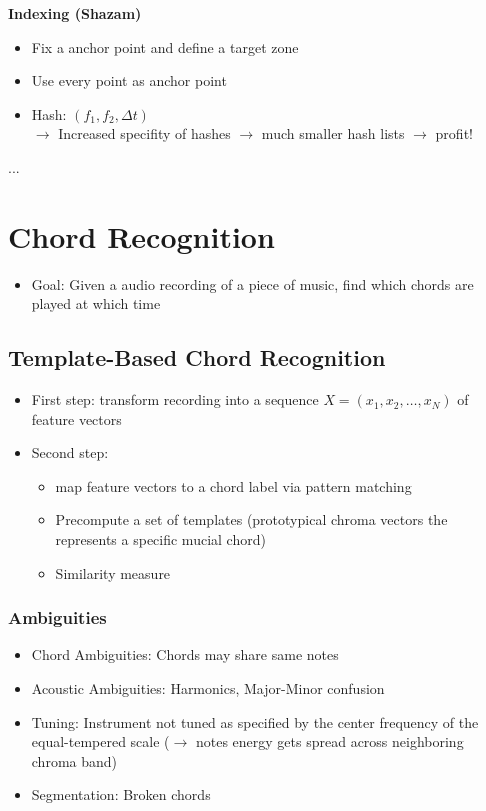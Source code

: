 \documentclass{scrartcl}
\begin{document}
\textbf{Indexing (Shazam)}
\begin{itemize}
    \item
        Fix a anchor point and define a target zone
    \item
        Use every point as anchor point
    \item
        Hash: $(f_1, f_2, \Delta t)$\\
        $\rightarrow$ Increased specifity of hashes $\rightarrow$ much smaller hash lists $\rightarrow$ profit!
\end{itemize}
...

\newpage

\section{Chord Recognition}
\begin{itemize}
    \item
        Goal: Given a audio recording of a piece of music, find which chords are played at which time
\end{itemize}
\subsection*{Template-Based Chord Recognition}
\begin{itemize}
    \item
        First step: transform recording into a sequence $X = (x_1, x_2, \dots, x_N)$ of feature vectors
    \item
        Second step: 

        \begin{itemize}
            \item 
                map feature vectors to a chord label via pattern matching
            \item
                Precompute a set of templates (prototypical chroma vectors the represents a specific mucial chord)
            \item
                Similarity measure
        \end{itemize}
\end{itemize}
\subsubsection*{Ambiguities}
\begin{itemize}
    \item
        Chord Ambiguities: Chords may share same notes
    \item
        Acoustic Ambiguities: Harmonics, Major-Minor confusion 
    \item
        Tuning: Instrument not tuned as specified by the center frequency of the equal-tempered scale ($\rightarrow$ notes energy gets spread across neighboring chroma band)
    \item
        Segmentation: Broken chords
\end{itemize}
\end{document}
